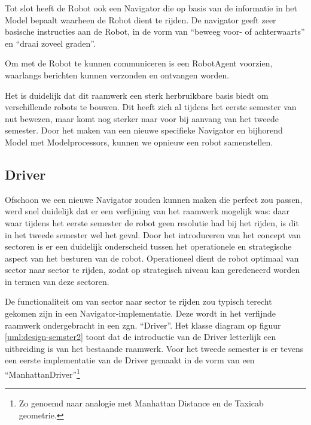 \documentclass[12pt,a4paper]{report}
\begin{document}
Tot slot heeft de Robot ook een Navigator die op basis van de informatie in het Model bepaalt waarheen de Robot dient te rijden. De navigator geeft zeer basische instructies aan de Robot, in de vorm van ``beweeg voor- of achterwaarts'' en ``draai zoveel graden''.

Om met de Robot te kunnen communiceren is een RobotAgent voorzien, waarlangs berichten kunnen verzonden en ontvangen worden.

Het is duidelijk dat dit raamwerk een sterk herbruikbare basis biedt om verschillende robots te bouwen. Dit heeft zich al tijdens het eerste semester van nut bewezen, maar komt nog sterker naar voor bij aanvang van het tweede semester. Door het maken van een nieuwe specifieke Navigator en bijhorend Model met Modelprocessors, kunnen we opnieuw een robot samenstellen.

\subsection{Driver}

Ofschoon we een nieuwe Navigator zouden kunnen maken die perfect zou passen, werd snel duidelijk dat er een verfijning van het raamwerk mogelijk was: daar waar tijdens het eerste semester de robot geen resolutie had bij het rijden, is dit in het tweede semester wel het geval. Door het introduceren van het concept van sectoren is er een duidelijk onderscheid tussen het operationele en strategische aspect van het besturen van de robot. Operationeel dient de robot optimaal van sector naar sector te rijden, zodat op strategisch niveau kan geredeneerd worden in termen van deze sectoren.

De functionaliteit om van sector naar sector te rijden zou typisch terecht gekomen zijn in een Navigator-implementatie. Deze wordt in het verfijnde raamwerk ondergebracht in een zgn. ``Driver''. Het klasse diagram op figuur \ref{uml:design-semster2} toont dat de introductie van de Driver letterlijk een uitbreiding is van het bestaande raamwerk. Voor het tweede semester is er tevens een eerste implementatie van de Driver gemaakt in de vorm van een ``ManhattanDriver''\footnote{Zo genoemd naar analogie met Manhattan Distance en de Taxicab geometrie.} 
\end{document}
